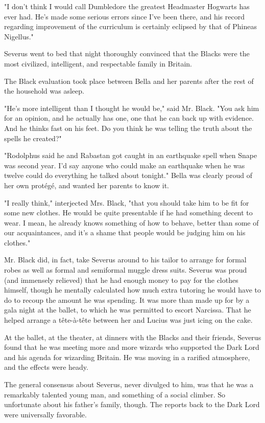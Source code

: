 \documentclass[a4paper,11pt]{article}
\begin{document}
"I don't think I would call Dumbledore the greatest Headmaster Hogwarts has ever had. He's made some serious errors since I've been there, and his record regarding improvement of the curriculum is certainly eclipsed by that of Phineas Nigellus."

Severus went to bed that night thoroughly convinced that the Blacks were the most civilized, intelligent, and respectable family in Britain.

The Black evaluation took place between Bella and her parents after the rest of the household was asleep.

"He's more intelligent than I thought he would be," said Mr. Black. "You ask him for an opinion, and he actually has one, one that he can back up with evidence. And he thinks fast on his feet. Do you think he was telling the truth about the spells he created?"

"Rodolphus said he and Rabastan got caught in an earthquake spell when Snape was second year. I'd say anyone who could make an earthquake when he was twelve could do everything he talked about tonight." Bella was clearly proud of her own protégé, and wanted her parents to know it.

"I really think," interjected Mrs. Black, "that you should take him to be fit for some new clothes. He would be quite presentable if he had something decent to wear. I mean, he already knows something of how to behave, better than some of our acquaintances, and it's a shame that people would be judging him on his clothes."

Mr. Black did, in fact, take Severus around to his tailor to arrange for formal robes as well as formal and semiformal muggle dress suits. Severus was proud (and immensely relieved) that he had enough money to pay for the clothes himself, though he mentally calculated how much extra tutoring he would have to do to recoup the amount he was spending. It was more than made up for by a gala night at the ballet, to which he was permitted to escort Narcissa. That he helped arrange a tête-à-tête between her and Lucius was just icing on the cake.

At the ballet, at the theater, at dinners with the Blacks and their friends, Severus found that he was meeting more and more wizards who supported the Dark Lord and his agenda for wizarding Britain. He was moving in a rarified atmosphere, and the effects were heady.

The general consensus about Severus, never divulged to him, was that he was a remarkably talented young man, and something of a social climber. So unfortunate about his father's family, though. The reports back to the Dark Lord were universally favorable.
\end{document}
